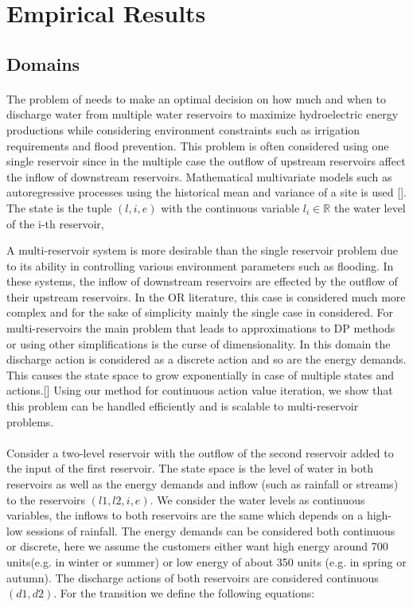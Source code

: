 \documentclass[letterpaper]{article}
\renewcommand{\-}{\text{-}}
\begin{document}
\section{Empirical Results}



\subsection{Domains}

\paragraph{\WaterReservoir}The problem of \WaterReservoir needs to make an optimal decision on how much and when to discharge water from multiple water reservoirs to maximize hydroelectric energy productions while considering environment constraints such as irrigation requirements and flood prevention. This problem is often considered using 
one single reservoir since in the multiple case the outflow of upstream reservoirs affect the inflow of downstream reservoirs. Mathematical multivariate models such as autoregressive  processes using the historical mean and variance of a site is used []. 
The state is the tuple $(l,i,e)$ with the continuous variable $l_i \in\mathbb{R}$ the water level of the i-th reservoir,

A multi-reservoir system is more desirable than the single reservoir problem due to its ability in controlling various environment parameters such as flooding. 
In these systems, the inflow of downstream reservoirs are effected by the outflow of their upstream reservoirs. In the OR literature, this case 
is considered much more complex and for the sake of simplicity mainly the single case in considered. For multi-reservoirs the main problem that leads to 
approximations to DP methods or using other simplifications is the curse of dimensionality. In this domain the discharge action is considered as a discrete action 
and so are the energy demands. This causes the state space to grow exponentially in case of multiple states and actions.[]
Using our method for continuous action value iteration, we show that this problem can be handled efficiently and is scalable to multi-reservoir problems. 

\paragraph{\MultiWaterReservoir} Consider a two-level reservoir with the outflow of the second reservoir added to the input of the first reservoir. The state space is the level of water in both reservoirs as well as the energy demands and inflow (such as rainfall or streams) to the reservoirs $(l1,l2,i,e)$. We consider the water levels as continuous variables, the inflows to both reservoirs are the same which depends on a high-low sessions of rainfall. The energy demands can be considered both continuous or discrete, here we assume the customers either want high energy around 700 units(e.g. in winter or summer) or low energy of about 350 units (e.g. in spring or autumn). 
The discharge actions of both reservoirs are considered continuous $(d1,d2)$. For the transition we define the following equations: 
\end{document}
